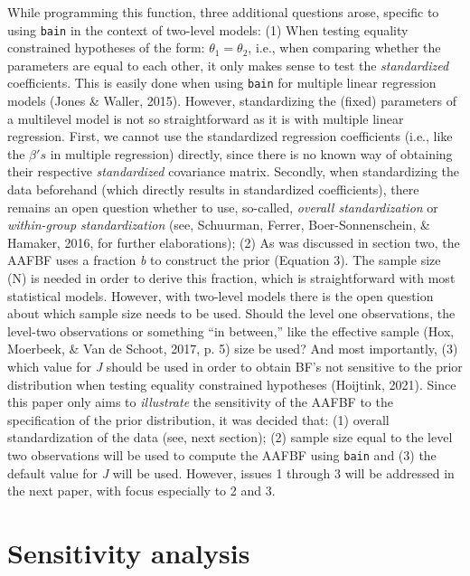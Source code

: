 \documentclass[
  english,
  man]{apa6}
\begin{document}
While programming this function, three additional questions arose, specific to using \texttt{bain} in the context of two-level models: (1) When testing equality constrained hypotheses of the form: \(\theta_1 = \theta_2\), i.e., when comparing whether the parameters are equal to each other, it only makes sense to test the \emph{standardized} coefficients. This is easily done when using \texttt{bain} for multiple linear regression models (Jones \& Waller, 2015). However, standardizing the (fixed) parameters of a multilevel model is not so straightforward as it is with multiple linear regression. First, we cannot use the standardized regression coefficients (i.e., like the \(\beta's\) in multiple regression) directly, since there is no known way of obtaining their respective \emph{standardized} covariance matrix. Secondly, when standardizing the data beforehand (which directly results in standardized coefficients), there remains an open question whether to use, so-called, \emph{overall standardization} or \emph{within-group standardization} (see, Schuurman, Ferrer, Boer-Sonnenschein, \& Hamaker, 2016, for further elaborations); (2) As was discussed in section two, the AAFBF uses a fraction \emph{b} to construct the prior (Equation 3). The sample size (N) is needed in order to derive this fraction, which is straightforward with most statistical models. However, with two-level models there is the open question about which sample size needs to be used. Should the level one observations, the level-two observations or something ``in between,'' like the effective sample (Hox, Moerbeek, \& Van de Schoot, 2017, p. 5) size be used? And most importantly, (3) which value for \emph{J} should be used in order to obtain BF's not sensitive to the prior distribution when testing equality constrained hypotheses (Hoijtink, 2021).
Since this paper only aims to \emph{illustrate} the sensitivity of the AAFBF to the specification of the prior distribution, it was decided that: (1) overall standardization of the data (see, next section); (2) sample size equal to the level two observations will be used to compute the AAFBF using \texttt{bain} and (3) the default value for \emph{J} will be used. However, issues 1 through 3 will be addressed in the next paper, with focus especially to 2 and 3.

\hypertarget{sensitivity-analysis}{%
\section{Sensitivity analysis}\label{sensitivity-analysis}}
\end{document}
